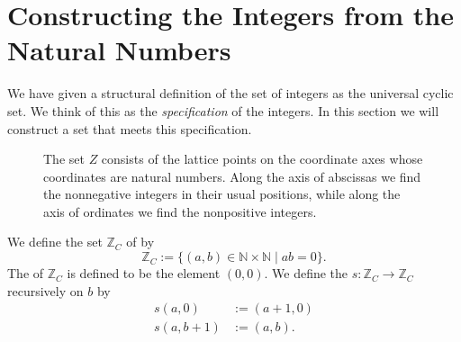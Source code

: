 \section{Constructing the Integers from the Natural Numbers}

We have given a structural definition of the set of integers as the universal cyclic set. We think of this as the \emph{specification} of the integers. In this section we will construct a set that meets this specification.

\begin{figure}[t]
  \centering
  \caption[The set of integers along the axis of the positive quadrant]{The set $Z$ consists of the lattice points on the coordinate axes whose coordinates are natural numbers. Along the axis of abscissas we find the nonnegative integers in their usual positions, while along the axis of ordinates we find the nonpositive integers.
}
  \label{figure:implementation-integers}
\end{figure}
  
\begin{definition}
  We define the set $\mathbb{Z}_C$ of  by
  \begin{equation*}
    \mathbb{Z}_C:=\{(a,b)\in\mathbb{N}\times\mathbb{N}\mid ab=0\}.
  \end{equation*}
  The  of $\mathbb{Z}_C$ is defined to be the element $(0,0)$. We define the  $s:\mathbb{Z}_C\to \mathbb{Z}_C$ recursively on $b$ by
  \begin{align*}
    s(a,0) & := (a+1,0) \\
    s(a,b+1) & := (a,b).
  \end{align*}
\end{definition}

